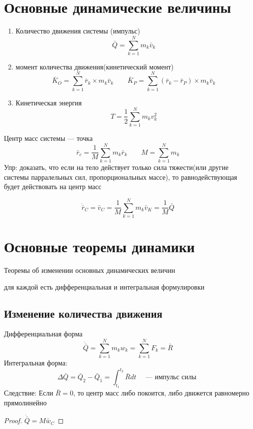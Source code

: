 \documentclass[crop=false]{standalone}
\begin{document}
\section{Основные динамические величины}
\begin{enumerate}
    \item Количество движения системы (импульс)
    \[\bar Q = \sum_{k=1}^{N} m_k \bar v_k\]
    
    \item момент количества движения(кинетический момент)
    \[\bar K_O = \sum_{k=1}^{N} \bar r_k \times m_k \bar v_k \qquad \bar K_P = \sum_{k=1}^{N} (\bar r_k - \bar r_P) \times m_k \bar v_k\]

    \item Кинетическая энергия
    \[T = \frac{1}{2} \sum_{k=1}^{N} m_k v_k^2\]
\end{enumerate}
\Def Центр масс системы — точка
\[\bar r_c = \frac{1}{M} \sum_{k=1}^{N} m_k \bar r_k \qquad M = \sum_{k=1}^{N} m_k\]
Упр: доказать, что если на тело действует только сила тяжести(или другие системы парралельных сил, пропорциональных массе), то равнодействующая будет действовать на центр масс

\noindent \keypoint
\[\dot{\bar r}_C = \bar v_C = \frac{1}{M} \sum_{k=1}^{N} m_k \bar v_K = \frac{1}{M} \bar Q\]


\section{Основные теоремы динамики}
Теоремы об изменении основных динамических величин

для каждой есть дифференциальная и интегральная формулировки

\subsection{Изменение количества движения}
Дифференциальная форма
\[\dot{\bar Q} = \sum_{k=1}^{N} m_k w_k = \sum_{k=1}^N F_k = \bar R\]
Интегральная форма:
\[\Delta \bar Q = \bar Q_2 - \bar Q_1 = \int_{t_1}^{t_2} \bar R dt \quad \text{ — импульс силы }\]
Следствие: Если $\bar R = 0$, то центр масс либо покоится, либо движется равномерно прямолинейно
\begin{proof}
    $\dot {\bar Q} = M \bar w_C$
\end{proof}
\end{document}
